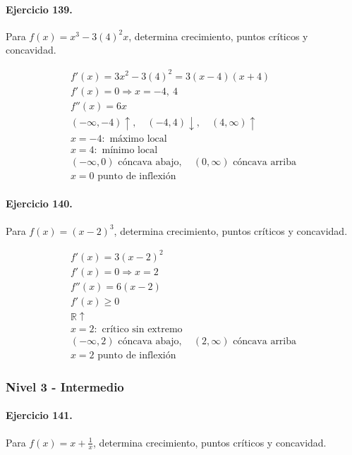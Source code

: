 \documentclass[11pt,a4paper]{article}
\begin{document}
\paragraph{Ejercicio 139.} Para $f(x)=x^3-3(4)^2x$, determina crecimiento, puntos críticos y concavidad.

\[
\begin{aligned}
f'(x)=3x^2-3(4)^2=3(x-4)(x+4)\\
f'(x)=0\Rightarrow x=-4,\ 4\\
f''(x)=6x\\
(-\infty,-4)\uparrow,\quad(-4,4)\downarrow,\quad(4,\infty)\uparrow\\
x=-4:\text{ máximo local}\\
x=4:\text{ mínimo local}\\
(-\infty,0)\text{{ cóncava abajo}},\quad(0,\infty)\text{{ cóncava arriba}}\\
x=0\text{{ punto de inflexión}}
\end{aligned}
\]


\paragraph{Ejercicio 140.} Para $f(x)=(x-2)^3$, determina crecimiento, puntos críticos y concavidad.

\[
\begin{aligned}
f'(x)=3(x-2)^2\\
f'(x)=0\Rightarrow x=2\\
f''(x)=6(x-2)\\
f'(x)\ge0\\
\mathbb{R}\uparrow\\
x=2:\text{ crítico sin extremo}\\
(-\infty,2)\text{ cóncava abajo},\quad(2,\infty)\text{ cóncava arriba}\\
x=2\text{ punto de inflexión}
\end{aligned}
\]


\newpage

\subsubsection*{Nivel 3 - Intermedio}

\paragraph{Ejercicio 141.} Para $f(x)=x+\frac{1}{x}$, determina crecimiento, puntos críticos y concavidad.
\end{document}
